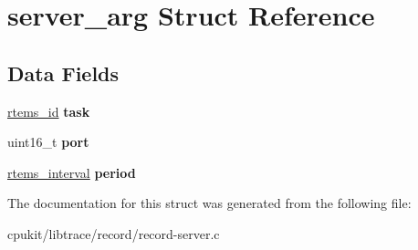 \hypertarget{structserver__arg}{}\section{server\+\_\+arg Struct Reference}
\label{structserver__arg}
\subsection*{Data Fields}
\begin{DoxyCompactItemize}
\item 
\mbox{\label{structserver__arg_afccc4f0c4efca37b94d145426bb6f3fb}} 
\mbox{\hyperlink{group__ClassicTasks_gab20892b814dced7dd4e5b9bf42becd57}{rtems\+\_\+id}} {\bfseries task}
\item 
\mbox{\label{structserver__arg_ab14b76189318da9285692a4136a1bce8}} 
uint16\+\_\+t {\bfseries port}
\item 
\mbox{\label{structserver__arg_a9321e6b024ba1a60ba6d08133a8be7ab}} 
\mbox{\hyperlink{group__ClassicTasks_gad39c43f949683d46874e3a5586b93aee}{rtems\+\_\+interval}} {\bfseries period}
\end{DoxyCompactItemize}


The documentation for this struct was generated from the following file\+:\begin{DoxyCompactItemize}
\item 
cpukit/libtrace/record/record-\/server.\+c\end{DoxyCompactItemize}
